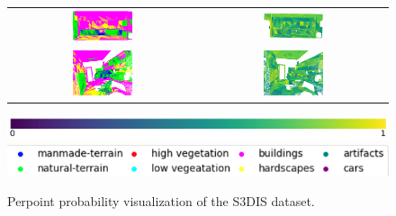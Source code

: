 \begin{figure}[h!]
\begin{tabular}{cc}
            \includegraphics[width=0.33\textwidth, height=0.18\textheight]{images/seg_output/s3dis_DE/S3DIS_3_Pred.png}& 
            \includegraphics[width=0.33\textwidth, height=0.18\textheight]{images/seg_output/s3dis_DE/S3DIS_3_prob.png}\\

            \includegraphics[width=0.33\textwidth, height=0.18\textheight]{images/seg_output/s3dis_DE/S3DIS_4_Pred.png}& 
            \includegraphics[width=0.33\textwidth, height=0.18\textheight]{images/seg_output/s3dis_DE/S3DIS_4_prob.png}\\
        \end{tabular}
        \includegraphics[scale=0.45]{images/prob_legend.pdf}
        \includegraphics[scale=0.65]{images/legend.png}
        \caption{Perpoint probability visualization of the S3DIS dataset.}
        \label{fig:de_s3dis_probmap}
    \end{figure}

